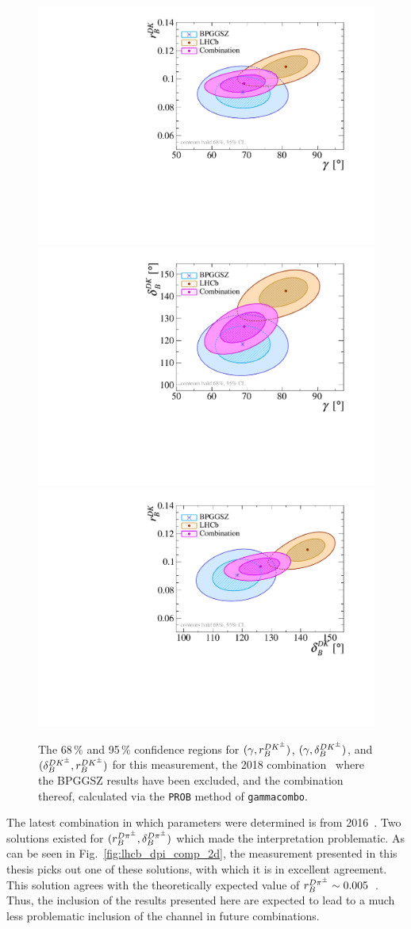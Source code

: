 \begin{figure}[tp]
    \centering
    \includegraphics[width=0.45\columnwidth]{figures/analysis/interpretation/2d_g_r_dk_vs_old_lhcb_prob.pdf}
    \includegraphics[width=0.45\columnwidth]{figures/analysis/interpretation/2d_g_d_dk_vs_old_lhcb_prob.pdf}
    \includegraphics[width=0.45\columnwidth]{figures/analysis/interpretation/2d_d_dk_r_dk_vs_old_lhcb_prob.pdf}
    \caption{The 68\,\% and 95\,\% confidence regions  for $(\gamma, r_B^{{{D}{{K}^\pm}}})$, $(\gamma, \delta_B^{{{D}{{K}^\pm}}})$, and $(\delta_B^{{{D}{{K}^\pm}}}, r_B^{{{D}{{K}^\pm}}})$ for this measurement, the 2018 \lhcb combination~\cite{LHCb-CONF-2018-002} where the BPGGSZ results have been excluded, and the combination thereof, calculated via the \texttt{PROB} method of \texttt{gammacombo}.}
    \label{fig:lhcb_dk_comp_2d}
\end{figure}



The latest \lhcb combination in which \BtoDpi parameters were determined is from 2016~\cite{LHCb-PAPER-2016-032}. Two solutions existed for $(r_B^{D\pi^\pm}, \delta_B^{D\pi^\pm})$ which made the interpretation problematic. As can be seen in Fig.~\ref{fig:lhcb_dpi_comp_2d}, the measurement presented in this thesis picks out one of these solutions, with which it is in excellent agreement. This solution agrees with the theoretically expected value of $r_B^{D\pi^\pm}\sim 0.005$~\cite{rDpi}. Thus, the inclusion of the results presented here are expected to lead to a much less problematic inclusion of the \BtoDpi channel in future \lhcb combinations.


